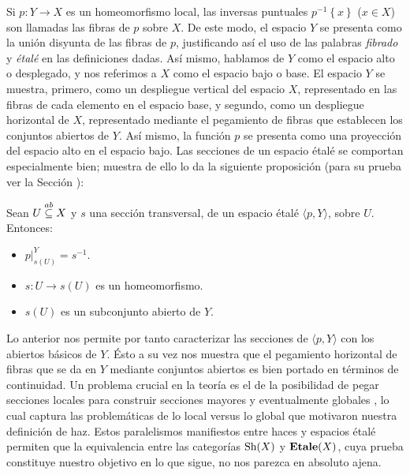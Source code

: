 Si $p:Y\to X$ es un homeomorfismo local, las inversas puntuales $p^{-1}\left\lbrace x\right\rbrace$ ($x\in X$) son llamadas las fibras de $p$ sobre $X$. De este modo, el espacio $Y$ se presenta como la unión disyunta de las fibras de $p$, justificando así el uso de las palabras \textit{fibrado} y \textit{étalé} en las definiciones dadas. Así mismo, hablamos de $Y$ como el espacio alto o desplegado, y nos referimos a $X$ como el espacio bajo o base. El espacio $Y$ se muestra, primero, como un despliegue vertical del espacio $X$, representado en las fibras de cada elemento en el espacio base, y segundo, como un despliegue horizontal de $X$, representado mediante el pegamiento de fibras que establecen los conjuntos abiertos de $Y$. Así mismo, la función $p$ se presenta como una proyección del espacio alto en el espacio bajo. Las secciones de un espacio étalé se comportan especialmente bien; muestra de ello lo da la siguiente proposición (para su prueba ver la Sección ):
\begin{Prop}
   Sean $U\stackrel{ab}{\subseteq} X$ y $s$ una sección transversal, de un espacio étalé $\langle p, Y\rangle$, sobre $U$. Entonces:
   \begin{itemize}
      \item $p|^{Y}_{s(U)}=s^{-1}$.
      \item $s:U\to s(U)$ es un homeomorfismo.
      \item $s(U)$ es un subconjunto abierto de $Y$.
   \end{itemize}
\end{Prop}
Lo anterior nos permite por tanto caracterizar las secciones de $\langle p, Y\rangle$ con los abiertos básicos de $Y$. Ésto a su vez nos muestra que el pegamiento horizontal de fibras que se da en $Y$ mediante conjuntos abiertos es bien portado en términos de continuidad. Un problema crucial en la teoría es el de la posibilidad de pegar secciones locales para construir secciones mayores y eventualmente globales \cite{MHPM}, lo cual captura las problemáticas de lo local versus lo global que motivaron nuestra definición de haz. Estos paralelismos manifiestos entre haces y espacios étalé permiten que la equivalencia entre las categorías $\normalfont{\text{Sh}} (X)$ y $\normalfont{\textbf{Etale}} (X)$, cuya prueba constituye nuestro objetivo en lo que sigue, no nos parezca en absoluto ajena.
